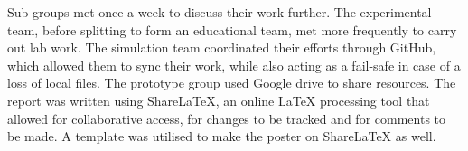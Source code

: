 Sub groups met once a week to discuss their work further. The experimental team, before splitting to form an educational team, met more frequently to carry out lab work. The simulation team coordinated their efforts through GitHub, which allowed them to sync their work, while also acting as a fail-safe in case of a loss of local files. The prototype group used Google drive to share resources. 
The report was written using ShareLaTeX, an online LaTeX processing tool that allowed for collaborative access, for changes to be tracked and for comments to be made. A template was utilised to make the poster on ShareLaTeX as well. 
